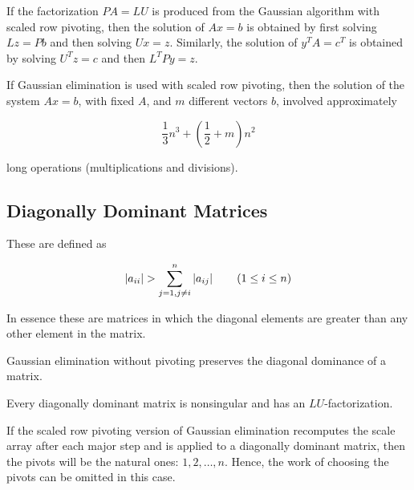     \begin{thm}[Solving $PA = LU$]
        If the factorization $PA = LU$ is produced from the Gaussian algorithm with scaled row pivoting, then the
        solution of $Ax=b$ is obtained by first solving $Lz=Pb$ and then solving $Ux=z$. Similarly, the solution of
        $y^TA=c^T$ is obtained by solving $U^Tz=c$ and then $L^TPy=z$.
    \end{thm}
    \begin{thm}
        If Gaussian elimination is used with scaled row pivoting, then the solution of the system $Ax=b$, with fixed
        $A$, and $m$ different vectors $b$, involved approximately

        \[ \frac{1}{3} n^3 + \left( \frac{1}{2} + m \right) n^2 \]

        long operations (multiplications and divisions).
    \end{thm}

    \subsection{Diagonally Dominant Matrices}
    These are defined as

    \[ \left\lvert a_{ii} \right\rvert > \sum^n_{j = 1, j \neq i} \left\lvert a_{ij} \right\rvert \qquad (1 \le i \le n) \]

    In essence these are matrices in which the diagonal elements are greater than any other element in the matrix.

    \begin{thm}
        Gaussian elimination without pivoting preserves the diagonal dominance of a matrix.
    \end{thm}

    \begin{thm}
        Every diagonally dominant matrix is nonsingular and has an $LU$-factorization.
    \end{thm}

    \begin{thm}
        If the scaled row pivoting version of Gaussian elimination recomputes the scale array after each major step and
        is applied to a diagonally dominant matrix, then the pivots will be the natural ones: $1, 2, \ldots, n$. Hence,
        the work of choosing the pivots can be omitted in this case.
    \end{thm}

